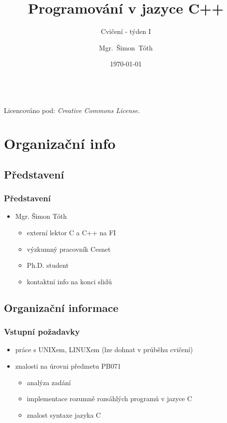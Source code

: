 

\title{Programování v jazyce C++}
\subtitle{Cvičení - týden I}
\author[]{Mgr.~Šimon~Tóth}
\date{\today}

\newcommand{\CcNote}[1]{%
        Licencováno pod: \textit{Creative Commons #1 3.0 License}.%
}


        \begin{frame}
                \titlepage
                \vfill
                \begin{center}
                \\
                {\tiny\CcNote{\CcLongnameByNcSa}}
                \vspace*{2ex}
                \end{center}
        \end{frame}

\section{Organizační info}
\subsection{Představení}
        
\begin{frame}
	\frametitle{Představení}
	\begin{itemize}
		\item{Mgr. Šimon Tóth}
		\begin{itemize}
			\item{externí lektor C a C++ na FI}
			\item{výzkumný pracovník Cesnet}
			\item{Ph.D. student}
			\item{kontaktní info na konci slidů}
		\end{itemize}
	\end{itemize}
\end{frame}

\subsection{Organizační informace}

\begin{frame}
	\frametitle{Vstupní požadavky}
	\begin{itemize}
		\item{práce s UNIXem, LINUXem (lze dohnat v průběhu cvičení)}
		\item{znalosti na úrovni předmetu PB071}
		\begin{itemize}
			\item{analýza zadání}
			\item{implementace rozumně rozsáhlých programů v jazyce C}
			\item{znalost syntaxe jazyka C}
		\end{itemize}
	\end{itemize}
\end{frame}

